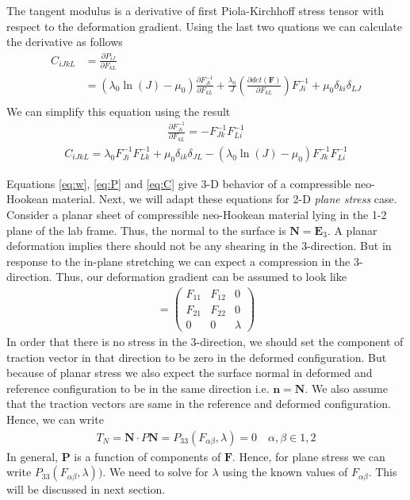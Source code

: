 \documentclass[../main.tex]{subfiles}
\begin{document}
The tangent modulus is a derivative of first Piola-Kirchhoff stress
tensor with respect to the deformation gradient. Using the last two
quations we can calculate the derivative as follows
\begin{align*}
  C_{iJkL}&=\frac{\partial P_{iJ}}{\partial F_{kL}}\\
          &= \left(\lambda_0\ln(J) - \mu_0\right)\frac{\partial F^{-1}_{Ji}}{\partial F_{kL}} + \frac{\lambda_0}{J}\left(\frac{\partial det(\mathbf{F})}{\partial F_{kL}}\right)F^{-1}_{Ji} + \mu_0\delta_{ki}\delta_{LJ}\\
\end{align*}
We can simplify this equation using the result
\begin{align*}
  \frac{\partial F^{-1}_{Ji}}{\partial F_{kL}} = -F^{-1}_{Jk}F^{-1}_{Li}
\end{align*}
\begin{align}
  \label{eq:C}
  \boxed{C_{iJkL}=\lambda_0F^{-1}_{Ji}F^{-1}_{Lk} + \mu_0\delta_{ik}\delta_{JL}-(\lambda_0\ln(J) - \mu_0)F^{-1}_{Jk}F^{-1}_{Li}}
\end{align}

Equations \ref{eq:w}, \ref{eq:P} and \ref{eq:C} give 3-D behavior of a
compressible neo-Hookean material. Next, we will adapt these equations
for 2-D \textit{plane stress} case. Consider a planar sheet of
compressible neo-Hookean material lying in the 1-2 plane of the lab
frame. Thus, the normal to the surface is $\bm{N} = \bm{E}_3$.  A
planar deformation implies there should not be any shearing in the
3-direction. But in response to the in-plane stretching we can expect
a compression in the 3-direction. Thus, our deformation gradient can
be assumed to look like
\begin{align*}
  [F_{iJ}] =
  \begin{pmatrix}
    F_{11} & F_{12} & 0\\
    F_{21} & F_{22} & 0\\
    0 & 0 & \lambda
  \end{pmatrix}
\end{align*}
In order that there is no stress in the 3-direction, we should set the
component of traction vector in that direction to be zero in the
deformed configuration. But because of planar stress we also expect
the surface normal in deformed and reference configuration to be in
the same direction i.e. $\bm{n} = \bm{N}$. We also assume that the
traction vectors are same in the reference and deformed
configuration. Hence, we can write
\begin{align}
  \label{eq:planeStress}
  T_N = \bm{N}\cdot P\bm{N} = P_{33}(F_{\alpha\beta},\lambda) = 0 \quad \alpha,\beta\in{1,2}
\end{align}
In general, $\mathbf{P}$ is a function of components of
$\mathbf{F}$. Hence, for plane stress we can write
$P_{33}(F_{\alpha\beta},\lambda))$. We need to solve for $\lambda$
using the known values of $F_{\alpha\beta}$. This will be discussed in
next section.
\end{document}
